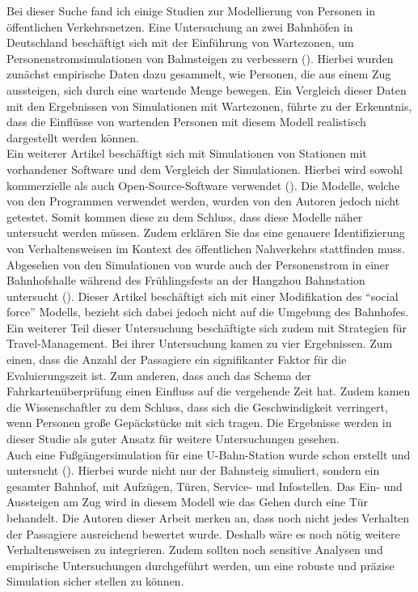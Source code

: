 Bei dieser Suche fand ich einige Studien zur Modellierung von Personen in öffentlichen Verkehrsnetzen.
Eine Untersuchung an zwei Bahnhöfen in Deutschland beschäftigt sich mit der Einführung von Wartezonen, um Personenstromsimulationen von Bahnsteigen zu verbessern (\cite{Davidich.2013}). Hierbei wurden zunächst empirische Daten dazu gesammelt, wie Personen, die aus einem Zug aussteigen, sich durch eine wartende Menge bewegen. Ein Vergleich dieser Daten mit den Ergebnissen von Simulationen mit Wartezonen, führte zu der Erkenntnis, dass die Einflüsse von wartenden Personen mit diesem Modell realistisch dargestellt werden können. \\
Ein weiterer Artikel beschäftigt sich mit Simulationen von Stationen mit vorhandener Software und dem Vergleich der Simulationen. Hierbei wird sowohl kommerzielle als auch Open-Source-Software verwendet (\cite{DubrocaVoisin.2019}). Die Modelle, welche von den Programmen verwendet werden, wurden von den Autoren jedoch nicht getestet. Somit kommen diese zu dem Schluss, dass diese Modelle näher untersucht werden müssen. Zudem erklären Sie das eine genauere Identifizierung von Verhaltensweisen im Kontext des öffentlichen Nahverkehrs stattfinden muss.\\
Abgesehen von den Simulationen von \cite{DubrocaVoisin.2019} wurde auch der Personenstrom in einer Bahnhofshalle während des Frühlingsfests an der Hangzhou Bahnstation untersucht (\cite{Wang.2013}). Dieser Artikel beschäftigt sich mit einer Modifikation des "`social force"' Modells, bezieht sich dabei jedoch nicht auf die Umgebung des Bahnhofes. Ein weiterer Teil dieser Untersuchung beschäftigte sich zudem mit Strategien für Travel-Management. Bei ihrer Untersuchung kamen \cite{Wang.2013} zu vier Ergebnissen. Zum einen, dass die Anzahl der Passagiere ein signifikanter Faktor für die Evaluierungszeit ist. Zum anderen, dass auch das Schema der Fahrkartenüberprüfung einen Einfluss auf die vergehende Zeit hat. Zudem kamen die Wissenschaftler zu dem Schluss, dass sich die Geschwindigkeit verringert, wenn Personen große Gepäckstücke mit sich tragen. Die Ergebnisse werden in dieser Studie als guter Ansatz für weitere Untersuchungen gesehen. \\
Auch eine Fußgängersimulation für eine U-Bahn-Station wurde schon erstellt und untersucht (\cite{Chen.2017}). Hierbei wurde nicht nur der Bahnsteig simuliert, sondern ein gesamter Bahnhof, mit Aufzügen, Türen, Service- und Infostellen. Das Ein- und Aussteigen am Zug wird in diesem Modell wie das Gehen durch eine Tür behandelt. Die Autoren dieser Arbeit merken an, dass noch nicht jedes Verhalten der Passagiere ausreichend bewertet wurde. Deshalb wäre es noch nötig weitere Verhaltensweisen zu integrieren. Zudem sollten noch sensitive Analysen und empirische Untersuchungen durchgeführt werden, um eine robuste und präzise Simulation sicher stellen zu können. \\
